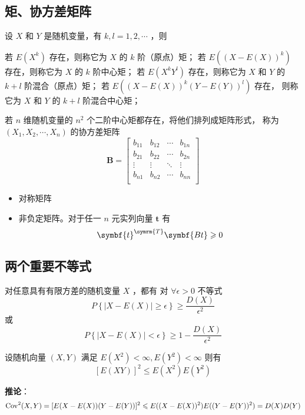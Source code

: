 \subsection{矩、协方差矩阵}

 设 $ X $ 和 $ Y $ 是随机变量，有 $ k,l = 1,2,\cdots $ ，则

 若 $ E(X^k) $ 存在，则称它为 $ X $ 的 $ k $ 阶（原点）矩；
 若 $ E((X - E(X))^k) $ 存在，则称它为  $ X $ 的 $ k $ 阶中心矩；
 若 $ E(X^kY^l) $ 存在，则称它为 $ X $ 和 $ Y $ 的 $ k+l $ 阶混合（原点）矩；
 若 $ E((X - E(X))^k (Y - E(Y))^l) $ 存在，
则称它为 $ X $ 和 $ Y $ 的 $ k+l $ 阶混合中心矩；

 若 $ n $ 维随机变量的 $ n^2 $ 个二阶中心矩都存在，将他们排列成矩阵形式，
称为 $ (X_1, X_2, \cdots, X_n) $ 的协方差矩阵
\begin{equation}
    \symbf{B} = \begin{bmatrix}
        b_{11} & b_{12} & \cdots & b_{1n} \\
        b_{21} & b_{22} & \cdots & b_{2n} \\
        \vdots & \vdots & \ddots & \vdots \\
        b_{n1} & b_{n2} & \cdots & b_{nn} \\
    \end{bmatrix}
\end{equation}

\begin{itemize}[leftmargin=\subparitemindent]
    \item 对称矩阵
    \item 非负定矩阵。对于任一 $ n $ 元实列向量 $ \symbf{t} $ 有
    $$ \symbf{t}^{\symrm{T}} \symbf{Bt} \geqslant 0 $$
\end{itemize}

\subsection{两个重要不等式}

 对任意具有有限方差的随机变量 $ X $ ，都有
对 $ \forall \epsilon > 0 $ 不等式
\begin{equation}
    P\left\{ \left| X - E(X) \right| \geqslant \epsilon \right\} \geqslant \frac{D(X)}{\epsilon^2}
\end{equation}
或
\begin{equation}
    P\left\{ \left| X - E(X) \right| < \epsilon \right\} \geqslant 1 - \frac{D(X)}{\epsilon^2}
\end{equation}

 设随机向量 $ (X,Y) $ 满足 $ E(X^2) < \infty, E(Y^2) < \infty $
则有 \begin{equation}
    \left[ E(XY) \right]^2 \leqslant E(X^2)E(Y^2)
\end{equation}

\textbf{推论}：
\begin{equation}
    \mathrm{Cov}^2(X,Y) = [E(X - E(X))(Y - E(Y))]^2 \leqslant E((X - E(X))^2)E((Y - E(Y))^2) = D(X)D(Y)
\end{equation}